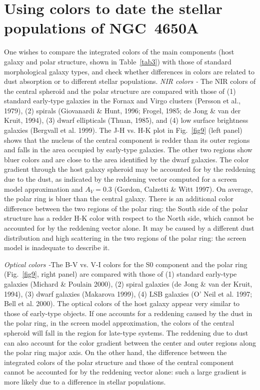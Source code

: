 \documentclass[preprint]{aastex}
\begin{document}
\section{Using colors to date the stellar populations of 
NGC~4650A}\label{stellar}
One wishes to compare the integrated colors of the main components 
(host galaxy and polar structure, shown in Table~\ref{tab3}) 
with those of standard morphological galaxy types, and check 
whether differences in colors are related to dust absorption or 
to different stellar populations.
\noindent
{\it NIR colors -} The NIR colors of the central spheroid and the polar 
structure are compared 
with those of (1) standard early-type galaxies in the Fornax and Virgo 
clusters (Persson et al., 1979), (2) spirals (Giovanardi \& Hunt, 1996; 
Frogel, 1985; de Jong \& van der Kruit,
1994), (3) dwarf ellipticals (Thuan, 1985), and (4) low surface brightness 
galaxies (Bergvall et al. 1999).
The J-H vs. H-K plot in Fig.~\ref{fig9} (left panel) shows that the nucleus 
of the central 
component is redder than its outer regions and falls in the area 
occupied by early-type galaxies. The other two regions
show bluer colors and are close to the area identified by the dwarf galaxies.
The color gradient through the host galaxy spheroid may be accounted for by
the reddening due to the dust, as indicated by the
reddening vector computed for a screen model approximation
and $A_{V}=0.3$ (Gordon, Calzetti \& Witt 1997).
On average, the polar ring is bluer than the central galaxy. 
There is an additional 
color difference between the two regions of the polar ring: 
the South side of the polar structure has 
a redder H-K color with respect to the North side, 
which cannot be accounted for by the reddening vector alone.
It may be caused by a different dust distribution and high scattering
in the two regions of the polar ring: the screen model is inadequate to describe it. 

\noindent
{\it Optical colors -}The B-V vs. V-I colors for the S0 component and the 
polar ring (Fig.~\ref{fig9}, right panel) are compared with those of (1) standard 
early-type galaxies (Michard \& Poulain 2000), (2) spiral galaxies 
(de Jong \& van der Kruit, 1994),
(3) dwarf galaxies (Makarova  1999),
(4) LSB galaxies (O' Neil et al. 1997; Bell et al. 2000). 
The optical colors of the host galaxy appear very similar to those of 
early-type objects.
If one accounts for a reddening caused by the dust in the polar ring,
in the screen model approximation, 
the colors of the central spheroid will fall in the region for
late-type systems. The reddening due to dust can also account for the 
color gradient between the center and outer regions along the polar 
ring major axis. On the other hand, the difference between the integrated 
colors of the polar structure and those of
the central component cannot be accounted for by the 
reddening vector alone: such a large gradient is more likely due to a difference 
in stellar populations.
\end{document}
